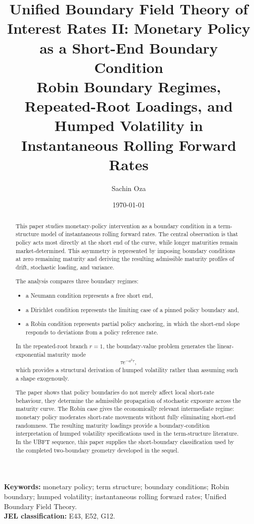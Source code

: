 \documentclass[11pt]{article}
\title{\textbf{Unified Boundary Field Theory of Interest Rates II: Monetary Policy as a Short-End Boundary Condition}\\[0.5em]
\large Robin Boundary Regimes, Repeated-Root Loadings, and Humped Volatility in Instantaneous Rolling Forward Rates}
\author{Sachin Oza}
\date{\today}
\numberwithin{equation}{section}
\begin{document}
\maketitle

\begin{abstract}
This paper studies monetary-policy intervention as a boundary condition in a term-structure model of instantaneous rolling forward rates. The central observation is that policy acts most directly at the short end of the curve, while longer maturities remain market-determined. This asymmetry is represented by imposing boundary conditions at zero remaining maturity and deriving the resulting admissible maturity profiles of drift, stochastic loading, and variance.

The analysis compares three boundary regimes: 
\begin{itemize}
    \item a Neumann condition represents a free short end, 
    \item a Dirichlet condition represents the limiting case of a pinned policy boundary and, 
    \item a Robin condition represents partial policy anchoring, in which the short-end slope responds to deviations from a policy reference rate. 
\end{itemize}
In the repeated-root branch $r=1$, the boundary-value problem generates the linear-exponential maturity mode
\[
\tau e^{-a^2\tau},
\]
which provides a structural derivation of humped volatility rather than assuming such a shape exogenously.

The paper shows that policy boundaries do not merely affect local short-rate behaviour, they determine the admissible propagation of stochastic exposure across the maturity curve. The Robin case gives the economically relevant intermediate regime: monetary policy moderates short-rate movements without fully eliminating short-end randomness. The resulting maturity loadings provide a boundary-condition interpretation of humped volatility specifications used in the term-structure literature. In the UBFT sequence, this paper supplies the short-boundary classification used by the completed two-boundary geometry developed in the sequel.
\end{abstract}

\noindent\textbf{Keywords:} monetary policy; term structure; boundary conditions; Robin boundary; humped volatility; instantaneous rolling forward rates; Unified Boundary Field Theory.\\
\textbf{JEL classification:} E43, E52, G12.
\end{document}
